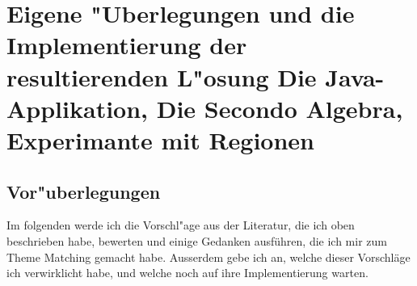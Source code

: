 \chapter[Eigene "Uberlegungen und die Implementierung \anmerkung{30 Seiten }]{Eigene "Uberlegungen und die Implementierung der resultierenden L"osung
\normalsize{Die Java-Applikation, Die Secondo Algebra, Experimante mit Regionen }
}
\minitoc
\newpage
\section{Vor"uberlegungen } \label{vorueberlegungen}
Im folgenden werde ich die Vorschl"age aus der Literatur, die ich oben beschrieben habe, bewerten und einige Gedanken ausführen, die ich mir zum Theme Matching gemacht habe. Ausserdem gebe ich an, welche dieser Vorschläge ich verwirklicht habe, und welche noch auf ihre Implementierung warten.

